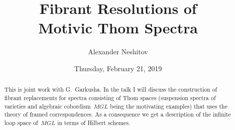 \documentclass{UAmathtalk}
\author{Alexander Neshitov}
\title{Fibrant Resolutions of\\ Motivic Thom Spectra}
\date{Thursday, February 21, 2019}
\begin{document}
\maketitle

\begin{abstract}
This is joint work with G.~Garkusha. In the talk I will discuss the construction of fibrant replacements for spectra consisting of Thom spaces (suspension spectra of varieties and algebraic cobordism~$\mathit{MGL}$ being the motivating examples) that uses the theory of framed correspondences. As a consequence we get a description of the infinite loop space of~$\mathit{MGL}$ in terms of Hilbert schemes.
\end{abstract}
\end{document}
